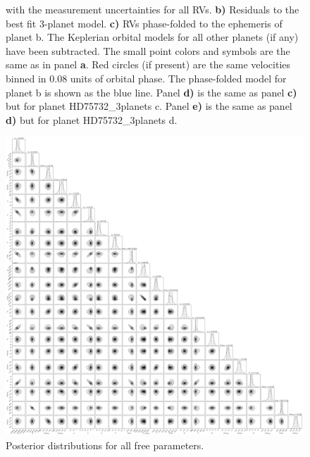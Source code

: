\documentclass{emulateapj}
\begin{document}
\begin{figure}[!h]
{with the measurement uncertainties for all RVs.
{\bf b)} Residuals to the best fit 3-planet model.
{\bf c)} RVs phase-folded to the ephemeris of planet b. The Keplerian orbital models for all other planets (if any) have been subtracted.
The small point colors and symbols are the same as in panel {\bf a}.
Red circles (if present) are the same velocities binned in 0.08 units of orbital phase.
The phase-folded model for planet b is shown as the blue line.
Panel {\bf d)} is the same as panel {\bf c)} but for planet HD75732\_3planets c.
Panel {\bf e)} is the same as panel {\bf d)} but for planet HD75732\_3planets d.
}
\end{figure}

\begin{figure}[!h]
\centering
\includegraphics[width=6.5in]{HD75732_3planet_corner.pdf}
\caption{Posterior distributions for all free parameters.}
\end{figure}

\end{document}
